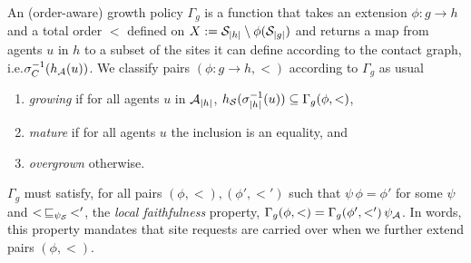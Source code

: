 \documentclass[a4paper,12pt]{article}
\newcommand{\ie}{i.e.\xspace}
\newcommand{\anon}[1]{\left|#1\right|}
\newcommand{\gp}{\Gamma}
\begin{document}

An (order-aware) growth policy $\gp_g$ is a function
that takes an extension $\phi: g \to h$
and a total order $<$ defined on
$X := \sites_{\anon{h}} \setminus \phi(\sites_{\anon{g}})$
and returns a map from agents $u$ in $h$
to a subset of the sites it can define
according to the contact graph,
\ie $\sigma^{-1}_C(h_{\mathcal{A}}(u))$.
We classify pairs $(\phi: g \to h, <)$ according to $\gp_g$ as usual
\begin{enumerate}[label={(\roman*)}]
\item \emph{growing} if for all agents $u$ in $\agents_{\anon{h}}$,
  $h_\sites(\sitemap^{-1}_{\anon{h}}(u)) \subseteq \gp_g(\phi, <)$,
\item \emph{mature} if for all agents $u$
  the inclusion is an equality, and
\item \emph{overgrown} otherwise.
\end{enumerate}
$\gp_g$ must satisfy,
for all pairs $(\phi, <), (\phi', <')$ such that
$\psi \, \phi = \phi'$ for some $\psi$ and
$< \,\sqsubseteq_{\psi_{\mathcal{S}}}\, <'$,
the \emph{local faithfulness} property,
$\gp_g(\phi, <) = \gp_g(\phi', {<'}) \, \psi_\agents$.
In words, this property mandates that site requests
are carried over when we further extend pairs $(\phi, <)$.
\end{document}

